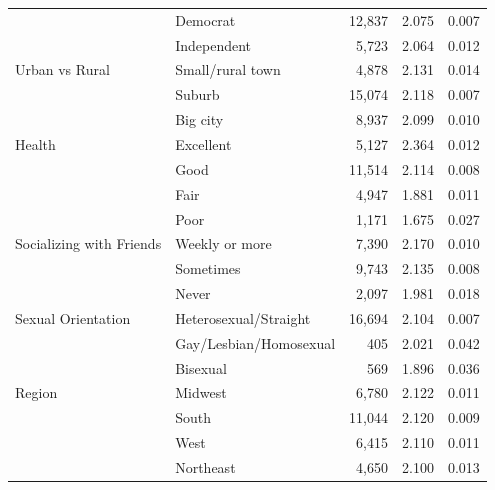 \begin{table}[htbp]
\begin{tabular}{llrrr}
 & Democrat & 12,837 & 2.075 & 0.007 \\
 & Independent & 5,723 & 2.064 & 0.012 \\
\midrule
Urban vs Rural & Small/rural town & 4,878 & 2.131 & 0.014 \\
 & Suburb & 15,074 & 2.118 & 0.007 \\
 & Big city & 8,937 & 2.099 & 0.010 \\
\midrule
Health & Excellent & 5,127 & 2.364 & 0.012 \\
 & Good & 11,514 & 2.114 & 0.008 \\
 & Fair & 4,947 & 1.881 & 0.011 \\
 & Poor & 1,171 & 1.675 & 0.027 \\
\midrule
Socializing with Friends & Weekly or more & 7,390 & 2.170 & 0.010 \\
 & Sometimes & 9,743 & 2.135 & 0.008 \\
 & Never & 2,097 & 1.981 & 0.018 \\
\midrule
Sexual Orientation & Heterosexual/Straight & 16,694 & 2.104 & 0.007 \\
 & Gay/Lesbian/Homosexual & 405 & 2.021 & 0.042 \\
 & Bisexual & 569 & 1.896 & 0.036 \\
\midrule
Region & Midwest & 6,780 & 2.122 & 0.011 \\
 & South & 11,044 & 2.120 & 0.009 \\
 & West & 6,415 & 2.110 & 0.011 \\
 & Northeast & 4,650 & 2.100 & 0.013 \\
\bottomrule
\end{tabular}
\end{table}
